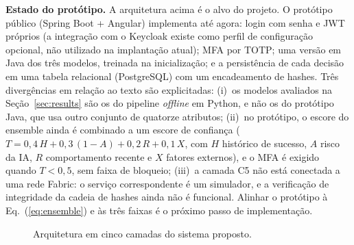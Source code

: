 \documentclass[conference]{IEEEtran}
\begin{document}
\textbf{Estado do protótipo.} A arquitetura acima é o alvo do projeto. O
protótipo público (Spring Boot + Angular) implementa até agora: login com
senha e JWT próprios (a integração com o Keycloak existe como perfil de
configuração opcional, não utilizado na implantação atual); MFA por TOTP;
uma versão em Java dos três modelos, treinada na inicialização; e a
persistência de cada decisão em uma tabela relacional (PostgreSQL) com um
encadeamento de hashes. Três divergências em relação ao texto são
explicitadas: (i)~os modelos avaliados na Seção~\ref{sec:results} são os
do pipeline \emph{offline} em Python, e não os do protótipo Java, que usa
outro conjunto de quatorze atributos; (ii)~no protótipo, o escore do
ensemble ainda é combinado a um escore de confiança
($T = 0{,}4\,H + 0{,}3\,(1-A) + 0{,}2\,R + 0{,}1\,X$, com $H$ histórico
de sucesso, $A$ risco da IA, $R$ comportamento recente e $X$ fatores
externos), e o MFA é exigido quando $T<0{,}5$, sem faixa de bloqueio;
(iii)~a camada C5 não está conectada a uma rede Fabric: o serviço
correspondente é um simulador, e a verificação de integridade da cadeia
de hashes ainda não é funcional. Alinhar o protótipo à
Eq.~(\ref{eq:ensemble}) e às três faixas é o próximo passo de
implementação.

\begin{figure}[t]
\centering
{}
\caption{Arquitetura em cinco camadas do sistema proposto.}
\label{fig:arch}
\end{figure}
\end{document}
